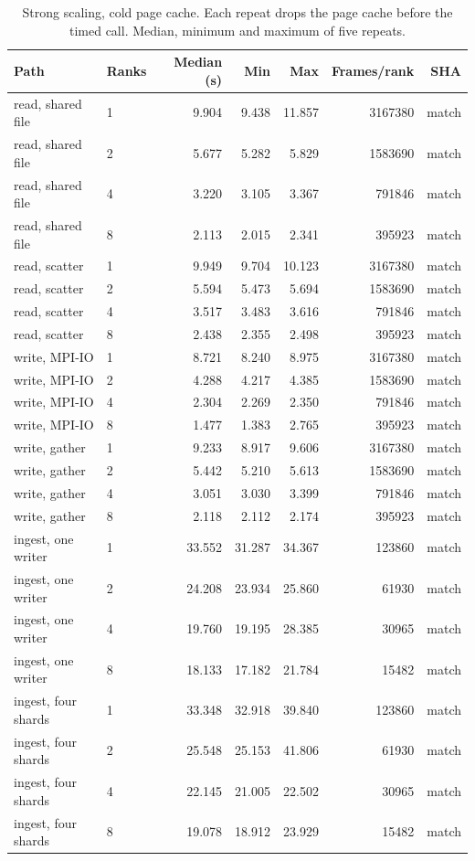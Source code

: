 \begin{table}[ht]
\centering
\scriptsize
\caption{Strong scaling, cold page cache. Each repeat drops the page cache before the timed call. Median, minimum and maximum of five repeats.}
\label{tab:mpi-strong-cold}
\begin{tabular}{llrrrrr}
\toprule
Path & Ranks & Median (s) & Min & Max & Frames/rank & SHA \\
\midrule
read, shared file & 1 & 9.904 & 9.438 & 11.857 & 3167380 & match \\
read, shared file & 2 & 5.677 & 5.282 & 5.829 & 1583690 & match \\
read, shared file & 4 & 3.220 & 3.105 & 3.367 & 791846 & match \\
read, shared file & 8 & 2.113 & 2.015 & 2.341 & 395923 & match \\
read, scatter & 1 & 9.949 & 9.704 & 10.123 & 3167380 & match \\
read, scatter & 2 & 5.594 & 5.473 & 5.694 & 1583690 & match \\
read, scatter & 4 & 3.517 & 3.483 & 3.616 & 791846 & match \\
read, scatter & 8 & 2.438 & 2.355 & 2.498 & 395923 & match \\
write, MPI-IO & 1 & 8.721 & 8.240 & 8.975 & 3167380 & match \\
write, MPI-IO & 2 & 4.288 & 4.217 & 4.385 & 1583690 & match \\
write, MPI-IO & 4 & 2.304 & 2.269 & 2.350 & 791846 & match \\
write, MPI-IO & 8 & 1.477 & 1.383 & 2.765 & 395923 & match \\
write, gather & 1 & 9.233 & 8.917 & 9.606 & 3167380 & match \\
write, gather & 2 & 5.442 & 5.210 & 5.613 & 1583690 & match \\
write, gather & 4 & 3.051 & 3.030 & 3.399 & 791846 & match \\
write, gather & 8 & 2.118 & 2.112 & 2.174 & 395923 & match \\
ingest, one writer & 1 & 33.552 & 31.287 & 34.367 & 123860 & match \\
ingest, one writer & 2 & 24.208 & 23.934 & 25.860 & 61930 & match \\
ingest, one writer & 4 & 19.760 & 19.195 & 28.385 & 30965 & match \\
ingest, one writer & 8 & 18.133 & 17.182 & 21.784 & 15482 & match \\
ingest, four shards & 1 & 33.348 & 32.918 & 39.840 & 123860 & match \\
ingest, four shards & 2 & 25.548 & 25.153 & 41.806 & 61930 & match \\
ingest, four shards & 4 & 22.145 & 21.005 & 22.502 & 30965 & match \\
ingest, four shards & 8 & 19.078 & 18.912 & 23.929 & 15482 & match \\
\bottomrule
\end{tabular}
\end{table}
